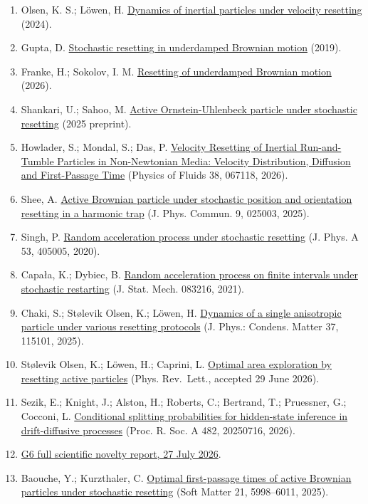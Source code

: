\begin{enumerate}
\item
  Olsen, K. S.; Löwen, H. \href{https://arxiv.org/abs/2401.12685}{Dynamics of inertial particles under velocity resetting} (2024).
\item
  Gupta, D. \href{https://arxiv.org/abs/1812.07227}{Stochastic resetting in underdamped Brownian motion} (2019).
\item
  Franke, H.; Sokolov, I. M. \href{https://journals.aps.org/pre/abstract/10.1103/qyl8-6q9h}{Resetting of underdamped Brownian motion} (2026).
\item
  Shankari, U.; Sahoo, M. \href{https://arxiv.org/abs/2509.18515}{Active Ornstein-Uhlenbeck particle under stochastic resetting} (2025 preprint).
\item
  Howlader, S.; Mondal, S.; Das, P. \href{https://arxiv.org/abs/2606.00560}{Velocity Resetting of Inertial Run-and-Tumble Particles in Non-Newtonian Media: Velocity Distribution, Diffusion and First-Passage Time} (Physics of Fluids 38, 067118, 2026).
\item
  Shee, A. \href{https://arxiv.org/abs/2409.06920}{Active Brownian particle under stochastic position and orientation resetting in a harmonic trap} (J. Phys. Commun. 9, 025003, 2025).
\item
  Singh, P. \href{https://arxiv.org/abs/2007.05576}{Random acceleration process under stochastic resetting} (J. Phys. A 53, 405005, 2020).
\item
  Capała, K.; Dybiec, B. \href{https://arxiv.org/abs/2105.05203}{Random acceleration process on finite intervals under stochastic restarting} (J. Stat. Mech. 083216, 2021).
\item
  Chaki, S.; Stølevik Olsen, K.; Löwen, H. \href{https://doi.org/10.1088/1361-648X/ada336}{Dynamics of a single anisotropic particle under various resetting protocols} (J. Phys.: Condens. Matter 37, 115101, 2025).
\item
  Stølevik Olsen, K.; Löwen, H.; Caprini, L. \href{https://journals.aps.org/prl/accepted/10.1103/sytg-m4ms}{Optimal area exploration by resetting active particles} (Phys. Rev.~Lett., accepted 29 June 2026).
\item
  Sezik, E.; Knight, J.; Alston, H.; Roberts, C.; Bertrand, T.; Pruessner, G.; Cocconi, L. \href{https://doi.org/10.1098/rspa.2025.0716}{Conditional splitting probabilities for hidden-state inference in drift-diffusive processes} (Proc. R. Soc. A 482, 20250716, 2026).
\item
  \href{https://github.com/blakepi/phasemap-reproducibility/blob/v3.1.1/literature-audit/G6_FULL_SCIENTIFIC_NOVELTY_REPORT_2026-07-27.md}{G6 full scientific novelty report, 27 July 2026}.
\item
  Baouche, Y.; Kurzthaler, C. \href{https://doi.org/10.1039/D5SM00340G}{Optimal first-passage times of active Brownian particles under stochastic resetting} (Soft Matter 21, 5998--6011, 2025).
\end{enumerate}
